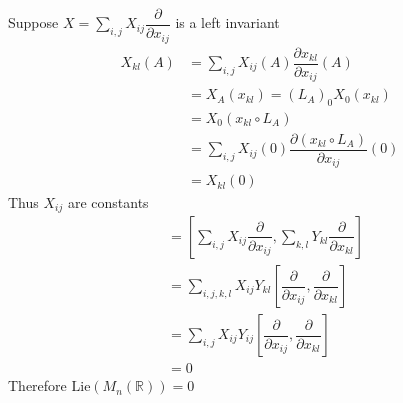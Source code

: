 \documentclass[main]{subfiles}
\begin{document}
\begin{example}
Suppose $X=\displaystyle\sum_{i,j}X_{ij}\dfrac{\partial}{\partial x_{ij}}$ is a left invariant
\begin{align*}
X_{kl}(A)&=\sum_{i,j}X_{ij}(A)\dfrac{\partial x_{kl}}{\partial x_{ij}}(A) \\
&=X_A(x_{kl})=(L_A)_0X_0(x_{kl}) \\
&=X_0(x_{kl}\circ L_A) \\
&=\sum_{i,j}X_{ij}(0)\dfrac{\partial (x_{kl}\circ L_A)}{\partial x_{ij}}(0) \\
&=X_{kl}(0)
\end{align*}
Thus $X_{ij}$ are constants
\begin{align*}
[X,Y]&=\displaystyle\left[\sum_{i,j}X_{ij}\dfrac{\partial}{\partial x_{ij}},\sum_{k,l}Y_{kl}\dfrac{\partial}{\partial x_{kl}}\right] \\
&=\sum_{i,j,k,l}X_{ij}Y_{kl}\left[\dfrac{\partial}{\partial x_{ij}},\dfrac{\partial}{\partial x_{kl}}\right] \\
&=\sum_{i,j}X_{ij}Y_{ij}\left[\dfrac{\partial}{\partial x_{ij}},\dfrac{\partial}{\partial x_{kl}}\right] \\
&=0
\end{align*}
Therefore $\mathrm{Lie}(M_n(\mathbb R))=0$
\end{example}
\end{document}
